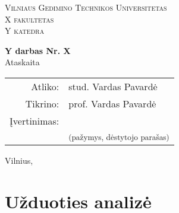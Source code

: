 \documentclass[a4paper, 12pt]{article}
\begin{document}

\begin{titlepage}

    \centering

    \begin{figure}
        \centering
    \end{figure}

    \textsc{\Large Vilniaus Gedimino Technikos Universitetas}\\[.5\baselineskip] %
    \textsc{\large X fakultetas}\\[.5\baselineskip] %
    \textsc{\large Y katedra}\\[.5\baselineskip] %

    \vspace{\fill}

    {\Large\bfseries Y darbas Nr. X}\\[1.0\baselineskip] %
    {\Large Ataskaita}

    \vspace{\fill}

    \begin{flushright}
        \begin{tabular}{rl}
            Atliko:       & stud. Vardas Pavardė\\
            Tikrino:      & prof. Vardas Pavardė\\[1cm]
            Įvertinimas: & \dotfill{}\\
            & \multicolumn{1}{c}{\large\textsuperscript{(pažymys, dėstytojo parašas)}}
        \end{tabular}
    \end{flushright}

    \vspace{\fill}

    Vilnius, \the\year{}

\end{titlepage}


\newpage

\tableofcontents

\newpage


\section{Užduoties analizė}
\end{document}
